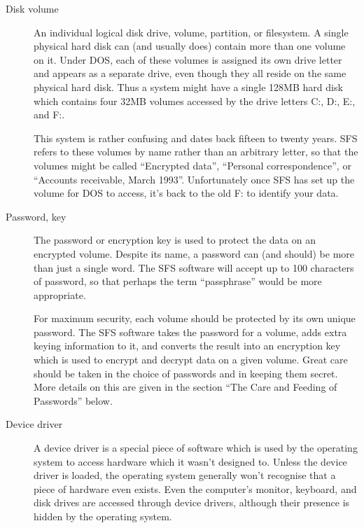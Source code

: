 \begin{description}

\item[Disk volume]

    An individual logical disk drive, volume, partition, or filesystem.  A
    single physical hard disk can (and usually does) contain more than one
    volume on it.  Under DOS, each of these volumes is assigned its own drive
    letter and appears as a separate drive, even though they all reside on the
    same physical hard disk.  Thus a system might have a single 128MB hard disk
    which contains four 32MB volumes accessed by the drive letters C:, D:, E:,
    and F:.

    This system is rather confusing and dates back fifteen to twenty years. SFS
    refers to these volumes by name rather than an arbitrary letter, so that
    the volumes might be called ``Encrypted data'', ``Personal correspondence'', or
    ``Accounts receivable, March 1993''.  Unfortunately once SFS has set up the
    volume for DOS to access, it's back to the old F: to identify your data.

\item[Password, key]

    The password or encryption key is used to protect the data on an encrypted
    volume.  Despite its name, a password can (and should) be more than just a
    single word.  The SFS software will accept up to 100 characters of
    password, so that perhaps the term ``passphrase'' would be more appropriate.

    For maximum security, each volume should be protected by its own unique
    password.  The SFS software takes the password for a volume, adds extra
    keying information to it, and converts the result into an encryption key
    which is used to encrypt and decrypt data on a given volume.  Great care
    should be taken in the choice of passwords and in keeping them secret. More
    details on this are given in the section ``The Care and Feeding of
    Passwords'' below.

\item[Device driver]

    A device driver is a special piece of software which is used by the
    operating system to access hardware which it wasn't designed to.  Unless
    the device driver is loaded, the operating system generally won't recognise
    that a piece of hardware even exists.  Even the computer's monitor,
    keyboard, and disk drives are accessed through device drivers, although
    their presence is hidden by the operating system.


\end{description}
